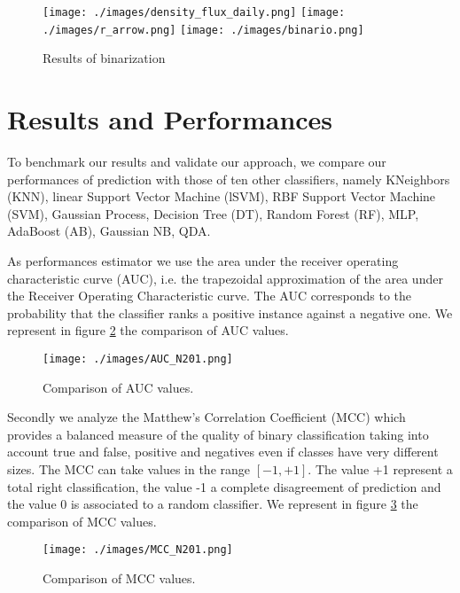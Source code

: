 \documentclass[a4paper,12pt]{article}
\begin{document}
\begin{figure}
{\texttt{[image: ./images/density\_flux\_daily.png]}}\quad
{\texttt{[image: ./images/r\_arrow.png]}}
{\texttt{[image: ./images/binario.png]}}
\caption{Results of binarization}\label{binary}
\end{figure}
\section{Results and Performances}
To benchmark our results and validate our approach, we compare our performances of prediction with those of ten other classifiers, namely KNeighbors (KNN), linear Support Vector Machine (lSVM), RBF Support Vector Machine (SVM), Gaussian Process, Decision Tree (DT), Random Forest (RF), MLP, AdaBoost (AB), Gaussian NB, QDA. 

As performances estimator we use the area under the receiver operating characteristic curve (AUC), i.e. the trapezoidal approximation of the area under the Receiver Operating Characteristic curve. The AUC corresponds to the probability that the classifier ranks a positive instance against a negative one. 
We represent in figure \ref{auc} the comparison of AUC values.
\begin{figure}
\texttt{[image: ./images/AUC\_N201.png]}
\caption{Comparison of AUC values.}\label{auc}
\end{figure}

Secondly we analyze the Matthew's Correlation Coefficient (MCC) which provides a balanced measure of the quality of binary classification taking into account true and false, positive and negatives even if classes have very different sizes. The MCC can take values in the range $[-1, +1]$.
The value +1 represent a total right classification, the value -1 a complete disagreement of prediction and the value 0 is associated to a random classifier.
We represent in figure \ref{mcc} the comparison of MCC values.
\begin{figure}
\texttt{[image: ./images/MCC\_N201.png]}
\caption{Comparison of MCC values.}\label{mcc}
\end{figure}
\end{document}
